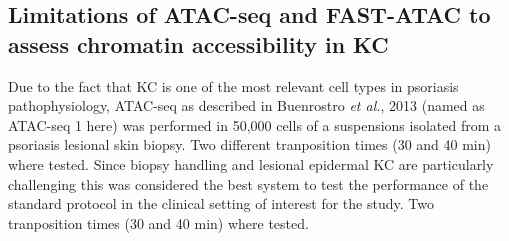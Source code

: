 \subsection{Limitations of ATAC-seq and FAST-ATAC to assess chromatin accessibility in KC}

Due to the fact that KC is one of the most relevant cell types in psoriasis pathophysiology, ATAC-seq as described in Buenrostro \textit{et al.}, 2013 (named as ATAC-seq 1 here) was performed in 50,000 cells of a suspensions isolated from a psoriasis lesional skin biopsy. Two different tranposition times (30 and 40 min) where tested. Since biopsy handling and lesional epidermal KC are particularly challenging this was considered the best system to test the performance of the standard protocol in the clinical setting of interest for the study. Two tranposition times (30 and 40 min) where tested.


